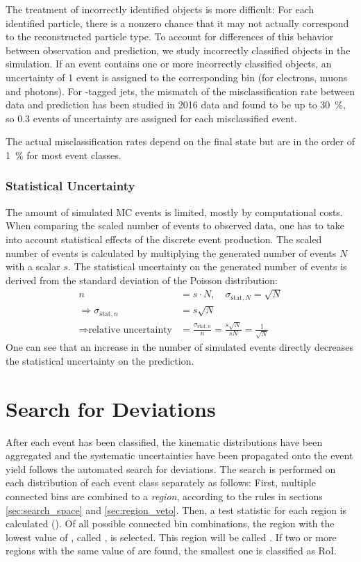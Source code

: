 The treatment of incorrectly identified objects is more difficult: For each identified particle, there is a nonzero chance that it may not actually correspond to the reconstructed particle type. To account for differences of this behavior between observation and prediction, we study incorrectly classified objects in the simulation. If an event contains one or more incorrectly classified objects, an uncertainty of \num{1} event is assigned to the corresponding bin (for electrons, muons and photons). 
For \Pqb-tagged jets, the mismatch of the misclassification rate between data and prediction has been studied in 2016 data and found to be up to \SI{30}{\percent}\cite[Fig. 73]{CMS:CMS-AN-2017-018}, so \num{0.3} events of uncertainty are assigned for each misclassified event. 

The actual misclassification rates depend on the final state but are in the order of \SI{1}{\percent} for most event classes.

\subsubsection{Statistical Uncertainty}
The amount of simulated \ac{MC} events is limited, mostly by computational costs. When comparing the scaled number of events to observed data, one has to take into account statistical effects of the discrete event production. The scaled number of events is calculated by multiplying the generated number of events $N$ with a scalar $s$. The statistical uncertainty on the generated number of events is derived from the standard deviation of the Poisson distribution: 
\begin{align}
    n &= s \cdot N, \quad \sigma_{\text{stat}, N} = \sqrt{N} \\
    \Rightarrow \sigma_{\text{stat}, n} &= s \sqrt{N} \\
    \Rightarrow \text{relative uncertainty} &= \frac{\sigma_{\text{stat}, n}}{n} = \frac{s \sqrt{N}}{s N} = \frac{1}{\sqrt{N}}
\end{align}
One can see that an increase in the number of simulated events directly decreases the statistical uncertainty on the prediction.

\section{Search for Deviations}
\label{sec:deviations_search}

After each event has been classified, the kinematic distributions have been aggregated and the systematic uncertainties have been propagated onto the event yield follows the automated search for deviations. The search is performed on each distribution of each event class separately as follows:
First, multiple connected bins are combined to a \emph{region}, according to the rules in  sections \ref{sec:search_space} and \ref{sec:region_veto}. Then, a test statistic \TS for each region is calculated (). Of all possible connected bin combinations, the region with the lowest value of \TS, called \TSmin, is selected. This region will be called . If two or more regions with the same value of \TSmin are found, the smallest one is classified as \ac{RoI}.

